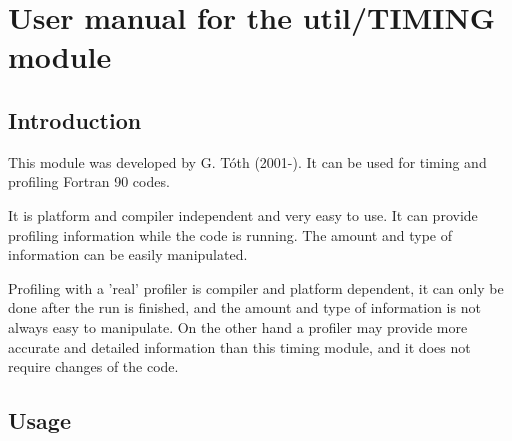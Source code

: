 \section{User manual for the util/TIMING module}

\subsection{Introduction}

This module was developed by G. T\'oth (2001-).
It can be used for timing and profiling Fortran 90 codes.

It is platform and compiler independent and very easy to use.
It can provide profiling information while the code is running.
The amount and type of information can be easily manipulated.

Profiling with a 'real' profiler is compiler and platform dependent, 
it can only be done after the run is finished, and the amount and
type of information is not always easy to manipulate. On the other hand
a profiler may provide more accurate and detailed information than 
this timing module, and it does not require changes of the code.

\subsection{Usage}

